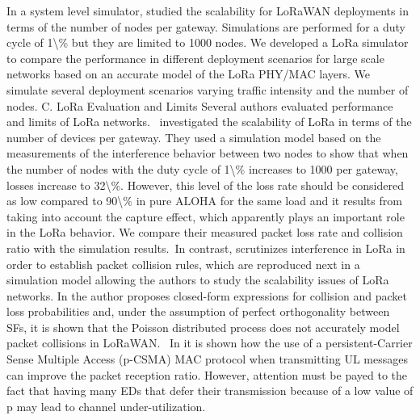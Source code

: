 \cite{jetmir_haxhibeqiri_lora_2017}   In a system level simulator, \citet{jetmir_haxhibeqiri_lora_2017} studied the scalability for LoRaWAN deployments in terms of the number of nodes per gateway. Simulations are performed for a duty cycle of 1\textbackslash\% but they are limited to 1000 nodes. We developed a LoRa simulator to compare the performance in different deployment scenarios for large scale networks based on an accurate model of the LoRa PHY/MAC layers. We simulate several deployment scenarios varying traffic intensity and the number of nodes. C. LoRa Evaluation and Limits Several authors evaluated performance and limits of LoRa networks.~\citet{jetmir_haxhibeqiri_lora_2017} investigated the scalability of LoRa in terms of the number of devices per gateway. They used a simulation model based on the measurements of the interference behavior between two nodes to show that when the number of nodes with the duty cycle of 1\textbackslash\% increases to 1000 per gateway, losses increase to 32\textbackslash\%. However, this level of the loss rate should be considered as low compared to 90\textbackslash\% in pure ALOHA for the same load and it results from taking into account the capture effect, which apparently plays an important role in the LoRa behavior. We compare their measured packet loss rate and collision ratio with the simulation results.~In contrast, \cite{jetmir_haxhibeqiri_lora_2017} scrutinizes interference in LoRa in order to establish packet collision rules, which are reproduced next in a simulation model allowing the authors to study the scalability issues of LoRa networks.   \newline 
 \cite{ferre_collision_2017}   In \cite{ferre_collision_2017} the author proposes closed-form expressions for collision and packet loss probabilities and, under the assumption of perfect orthogonality between SFs, it is shown that the Poisson distributed process does not accurately model packet collisions in LoRaWAN.~   \newline 
 \cite{kouvelas_employing_2018}   In \cite{kouvelas_employing_2018} it is shown how the use of a persistent-Carrier Sense Multiple Access (p-CSMA) MAC protocol when transmitting UL messages can improve the packet reception ratio. However, attention must be payed to the fact that having many EDs that defer their transmission because of a low value of p may lead to channel under-utilization.~   \newline 
 \cite{aden_hassan_evaluating_2019}    \newline 
 \cite{alami_memory_nodate}    \newline 
